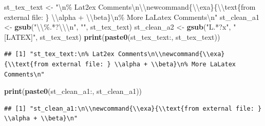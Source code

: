 \documentclass[
]{book}
\newenvironment{Shaded}{\begin{snugshade}}{\end{snugshade}}
\newcommand{\CharTok}[1]{\textcolor[rgb]{0.31,0.60,0.02}{#1}}
\newcommand{\KeywordTok}[1]{\textcolor[rgb]{0.13,0.29,0.53}{\textbf{#1}}}
\newcommand{\NormalTok}[1]{#1}
\newcommand{\StringTok}[1]{\textcolor[rgb]{0.31,0.60,0.02}{#1}}
\begin{document}
\begin{Shaded}
\begin{Highlighting}[]
\NormalTok{st\_tex\_text \textless{}{-}}\StringTok{ "}\CharTok{\textbackslash{}n}\StringTok{\% Lat2ex Comments}\CharTok{\textbackslash{}n\textbackslash{}\textbackslash{}}\StringTok{newcommand\{}\CharTok{\textbackslash{}\textbackslash{}}\StringTok{exa\}\{}\CharTok{\textbackslash{}\textbackslash{}}\StringTok{text\{from external file: \} }\CharTok{\textbackslash{}\textbackslash{}}\StringTok{alpha + }\CharTok{\textbackslash{}\textbackslash{}}\StringTok{beta\}}\CharTok{\textbackslash{}n}\StringTok{\% More LaLatex Comments}\CharTok{\textbackslash{}n}\StringTok{"}
\NormalTok{st\_clean\_a1 \textless{}{-}}\StringTok{ }\KeywordTok{gsub}\NormalTok{(}\StringTok{"}\CharTok{\textbackslash{}\textbackslash{}}\StringTok{\%.*?}\CharTok{\textbackslash{}\textbackslash{}\textbackslash{}n}\StringTok{"}\NormalTok{, }\StringTok{""}\NormalTok{, st\_tex\_text)}
\NormalTok{st\_clean\_a2 \textless{}{-}}\StringTok{ }\KeywordTok{gsub}\NormalTok{(}\StringTok{"L.*?x"}\NormalTok{, }\StringTok{"[LATEX]"}\NormalTok{, st\_tex\_text)}
\KeywordTok{print}\NormalTok{(}\KeywordTok{paste0}\NormalTok{(}\StringTok{\textquotesingle{}st\_tex\_text:\textquotesingle{}}\NormalTok{, st\_tex\_text))}
\end{Highlighting}
\end{Shaded}

\begin{verbatim}
## [1] "st_tex_text:\n% Lat2ex Comments\n\\newcommand{\\exa}{\\text{from external file: } \\alpha + \\beta}\n% More LaLatex Comments\n"
\end{verbatim}

\begin{Shaded}
\begin{Highlighting}[]
\KeywordTok{print}\NormalTok{(}\KeywordTok{paste0}\NormalTok{(}\StringTok{\textquotesingle{}st\_clean\_a1:\textquotesingle{}}\NormalTok{, st\_clean\_a1))}
\end{Highlighting}
\end{Shaded}

\begin{verbatim}
## [1] "st_clean_a1:\n\\newcommand{\\exa}{\\text{from external file: } \\alpha + \\beta}\n"
\end{verbatim}
\end{document}
